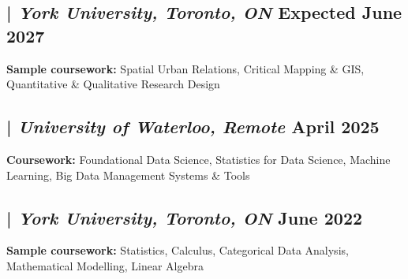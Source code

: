 
\subsection{ | \textit{York University, Toronto, ON}	\hfill Expected June 2027}

\begin{zitemize}
\item \textbf{Sample coursework:}  Spatial Urban Relations, Critical Mapping \& GIS, Quantitative \& Qualitative Research Design
\end{zitemize}

\vspace{2pt}
\subsection{ | \textit{University of Waterloo, Remote} \hfill	April 2025}
\begin{zitemize}
\item \textbf{Coursework:}  Foundational Data Science, Statistics for Data Science, Machine Learning, Big Data Management Systems \& Tools
\end{zitemize}
\vspace{2pt}
\subsection{ | \textit{York University, Toronto, ON} \hfill	June 2022}
\begin{zitemize}
\item \textbf{Sample coursework:}  Statistics, Calculus, Categorical Data Analysis, Mathematical Modelling, Linear Algebra
\end{zitemize}



